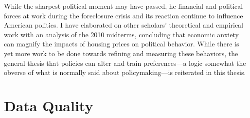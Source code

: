 \documentclass[12pt,oneside]{psthesis}
\begin{document}
While the sharpest political moment may have passed, he financial and political forces at work during the foreclosure crisis and its reaction continue to influence American politics.
I have elaborated on other scholars' theoretical and empirical work with an analysis of the 2010 midterms, concluding that economic anxiety can magnify the impacts of housing prices on political behavior.
While there is yet more work to be done towards refining and measuring these behaviors, the general thesis that policies can alter and train preferences---a logic somewhat the obverse of what is normally said about policymaking---is reiterated in this thesis.

\appendix

\hypertarget{data-quality}{%
\chapter{Data Quality}\label{data-quality}}
\end{document}
